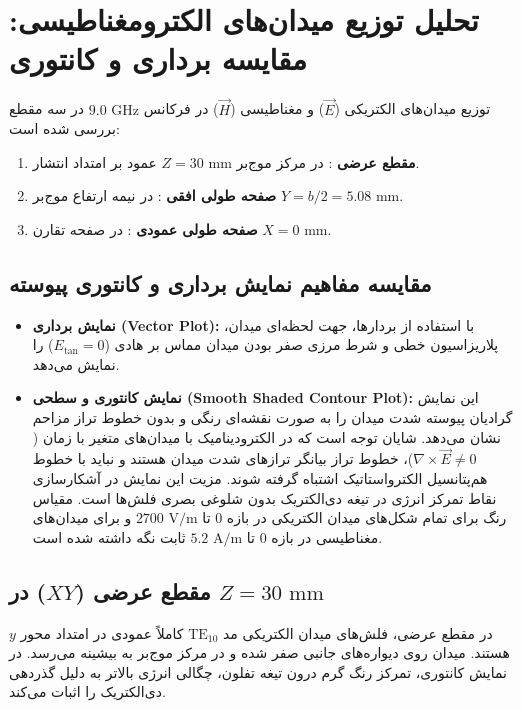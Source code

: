 \documentclass[11pt,a4paper]{article}
\begin{document}
\section{تحلیل توزیع میدان‌های الکترومغناطیسی: مقایسه برداری و کانتوری}

توزیع میدان‌های الکتریکی ($\vec{E}$) و مغناطیسی ($\vec{H}$) در فرکانس $9.0\text{ GHz}$ در سه مقطع بررسی شده است:
\begin{enumerate}
    \item \textbf{مقطع عرضی }: در مرکز موج‌بر $Z = 30\text{ mm}$ عمود بر امتداد انتشار.
    \item \textbf{صفحه طولی افقی }: در نیمه ارتفاع موج‌بر $Y = b/2 = 5.08\text{ mm}$.
    \item \textbf{صفحه طولی عمودی }: در صفحه تقارن $X = 0\text{ mm}$.
\end{enumerate}

\subsection{مقایسه مفاهیم نمایش برداری و کانتوری پیوسته}
\begin{itemize}
    \item \textbf{نمایش برداری (Vector Plot):} با استفاده از بردارها، جهت لحظه‌ای میدان، پلاریزاسیون خطی و شرط مرزی صفر بودن میدان مماس بر هادی ($E_{\text{tan}} = 0$) را نمایش می‌دهد.
    \item \textbf{نمایش کانتوری و سطحی (Smooth Shaded Contour Plot):} این نمایش گرادیان پیوسته شدت میدان را به صورت نقشه‌ای رنگی و بدون خطوط تراز مزاحم نشان می‌دهد. شایان توجه است که در الکترودینامیک با میدان‌های متغیر با زمان ($\nabla \times \vec{E} \ne 0$)، خطوط تراز بیانگر ترازهای شدت میدان هستند و نباید با خطوط هم‌پتانسیل الکترواستاتیک اشتباه گرفته شوند. مزیت این نمایش در آشکارسازی نقاط تمرکز انرژی در تیغه دی‌الکتریک بدون شلوغی بصری فلش‌ها است. مقیاس رنگ برای تمام شکل‌های میدان الکتریکی در بازه $0$ تا $2700\text{ V/m}$ و برای میدان‌های مغناطیسی در بازه $0$ تا $5.2\text{ A/m}$ ثابت نگه داشته شده است.
\end{itemize}

\subsection{مقطع عرضی ($XY$) در $Z = 30\text{ mm}$}
در مقطع عرضی، فلش‌های میدان الکتریکی مد $\text{TE}_{10}$ کاملاً عمودی در امتداد محور $y$ هستند. میدان روی دیواره‌های جانبی صفر شده و در مرکز موج‌بر به بیشینه می‌رسد. در نمایش کانتوری، تمرکز رنگ گرم درون تیغه تفلون، چگالی انرژی بالاتر به دلیل گذردهی دی‌الکتریک را اثبات می‌کند.
\end{document}
